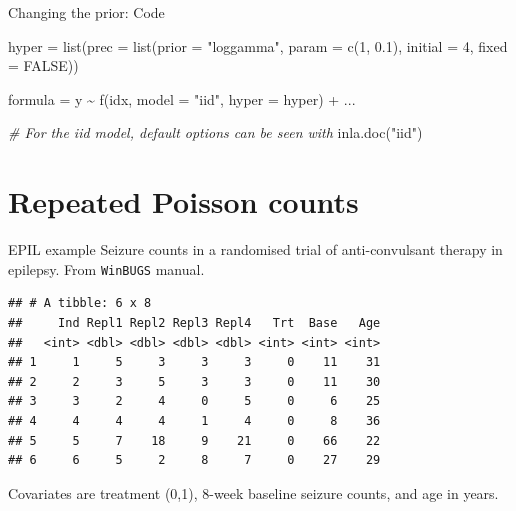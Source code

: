 \documentclass[
  handout]{beamer}
\newenvironment{Shaded}{\begin{snugshade}}{\end{snugshade}}
\newcommand{\AttributeTok}[1]{\textcolor[rgb]{0.77,0.63,0.00}{#1}}
\newcommand{\CommentTok}[1]{\textcolor[rgb]{0.56,0.35,0.01}{\textit{#1}}}
\newcommand{\ConstantTok}[1]{\textcolor[rgb]{0.00,0.00,0.00}{#1}}
\newcommand{\DecValTok}[1]{\textcolor[rgb]{0.00,0.00,0.81}{#1}}
\newcommand{\FloatTok}[1]{\textcolor[rgb]{0.00,0.00,0.81}{#1}}
\newcommand{\FunctionTok}[1]{\textcolor[rgb]{0.00,0.00,0.00}{#1}}
\newcommand{\NormalTok}[1]{#1}
\newcommand{\OtherTok}[1]{\textcolor[rgb]{0.56,0.35,0.01}{#1}}
\newcommand{\SpecialCharTok}[1]{\textcolor[rgb]{0.00,0.00,0.00}{#1}}
\newcommand{\StringTok}[1]{\textcolor[rgb]{0.31,0.60,0.02}{#1}}
\begin{document}
\begin{frame}[fragile]{Changing the prior: Code}
\protect\hypertarget{changing-the-prior-code}{}
\begin{Shaded}
\begin{Highlighting}[]
\NormalTok{hyper }\OtherTok{=} \FunctionTok{list}\NormalTok{(}\AttributeTok{prec =} \FunctionTok{list}\NormalTok{(}\AttributeTok{prior =} \StringTok{"loggamma"}\NormalTok{,}
                         \AttributeTok{param =} \FunctionTok{c}\NormalTok{(}\DecValTok{1}\NormalTok{, }\FloatTok{0.1}\NormalTok{),}
                         \AttributeTok{initial =} \DecValTok{4}\NormalTok{,}
                         \AttributeTok{fixed =} \ConstantTok{FALSE}\NormalTok{))}

\NormalTok{formula }\OtherTok{=}\NormalTok{ y }\SpecialCharTok{\textasciitilde{}} \FunctionTok{f}\NormalTok{(idx, }\AttributeTok{model =} \StringTok{"iid"}\NormalTok{, }\AttributeTok{hyper =}\NormalTok{ hyper) }\SpecialCharTok{+}\NormalTok{ ...}
\end{Highlighting}
\end{Shaded}

\begin{Shaded}
\begin{Highlighting}[]
\CommentTok{\# For the iid model, default options can be seen with}
\FunctionTok{inla.doc}\NormalTok{(}\StringTok{"iid"}\NormalTok{)}
\end{Highlighting}
\end{Shaded}

\normalsize
\end{frame}

\hypertarget{repeated-poisson-counts}{%
\section{Repeated Poisson counts}\label{repeated-poisson-counts}}

\begin{frame}[fragile]{EPIL example}
\protect\hypertarget{epil-example}{}
Seizure counts in a randomised trial of anti-convulsant therapy in
epilepsy. From \texttt{WinBUGS} manual. \small

\begin{verbatim}
## # A tibble: 6 x 8
##     Ind Repl1 Repl2 Repl3 Repl4   Trt  Base   Age
##   <int> <dbl> <dbl> <dbl> <dbl> <int> <int> <int>
## 1     1     5     3     3     3     0    11    31
## 2     2     3     5     3     3     0    11    30
## 3     3     2     4     0     5     0     6    25
## 4     4     4     4     1     4     0     8    36
## 5     5     7    18     9    21     0    66    22
## 6     6     5     2     8     7     0    27    29
\end{verbatim}

\normalsize

Covariates are treatment (0,1), 8-week baseline seizure counts, and age
in years.
\end{frame}
\end{document}
